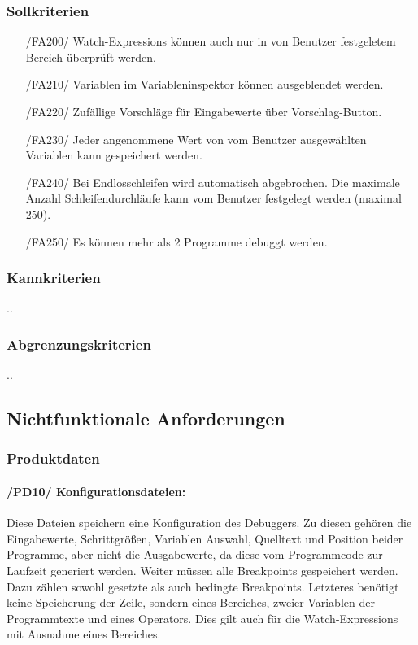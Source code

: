 \documentclass[parskip=full]{scrartcl}
\begin{document}
		\subsubsection{Sollkriterien}
		\begin{itemize}
		\item[/FA200/] Watch-Expressions können auch nur in von Benutzer festgeletem Bereich überprüft werden.
		\item[/FA210/] Variablen im Variableninspektor können ausgeblendet werden.
		\item[/FA220/] Zufällige Vorschläge für Eingabewerte über Vorschlag-Button.
		\item[/FA230/] Jeder angenommene Wert von vom Benutzer ausgewählten Variablen kann gespeichert werden.
		\item[/FA240/] Bei Endlosschleifen wird automatisch abgebrochen. Die maximale Anzahl Schleifendurchläufe kann vom Benutzer festgelegt werden (maximal 250).
		\item[/FA250/] Es können mehr als 2 Programme debuggt werden.
		\end{itemize}
		\subsubsection{Kannkriterien}
		..
		\subsubsection{Abgrenzungskriterien}
		..
	\subsection{Nichtfunktionale Anforderungen}
		\subsubsection{Produktdaten}
			\paragraph{/PD10/ Konfigurationsdateien:}
			Diese Dateien speichern eine Konfiguration des Debuggers.
			Zu diesen gehören die Eingabewerte, Schrittgrößen, Variablen Auswahl, 						Quelltext und Position beider Programme, aber nicht die Ausgabewerte, da diese 			vom Programmcode zur Laufzeit generiert werden.
			Weiter müssen alle Breakpoints gespeichert werden. Dazu zählen sowohl gesetzte 			als auch bedingte Breakpoints. Letzteres benötigt keine Speicherung der Zeile, 			sondern eines Bereiches, zweier Variablen der Programmtexte und eines Operators. 				Dies gilt auch für die Watch-Expressions mit Ausnahme eines Bereiches.
\end{document}
